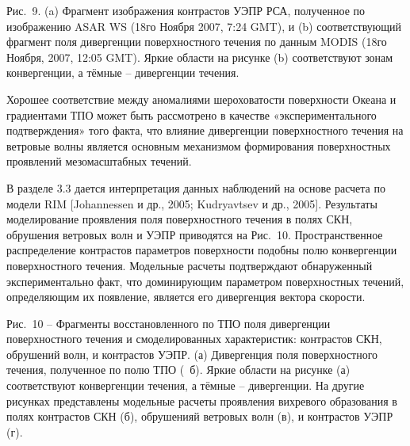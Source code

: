 Рис.~9. (a) Фрагмент изображения контрастов УЭПР РСА, полученное по изображению ASAR WS (18го Ноября 2007, 7:24 GMT), и (b) соответствующий фрагмент поля дивергенции поверхностного течения по данным MODIS (18го Ноября, 2007, 12:05 GMT). Яркие области на рисунке (b) соответствуют зонам конвергенции, а тёмные -- дивергенции течения.



Хорошее соответствие между аномалиями шероховатости поверхности Океана и градиентами ТПО может быть рассмотрено в качестве «экспериментального подтверждения» того факта, что влияние дивергенции поверхностного течения на ветровые волны является основным механизмом формирования поверхностных проявлений мезомасштабных течений. 



В разделе 3.3 дается интерпретация данных наблюдений на основе расчета по модели RIM [Johannessen и др., 2005; Kudryavtsev и др., 2005]. Результаты моделирование проявления поля поверхностного течения в полях СКН, обрушения ветровых волн и УЭПР приводятся на Рис.~10. Пространственное распределение контрастов параметров поверхности подобны полю конвергенции поверхностного течения. Модельные расчеты подтверждают обнаруженный экспериментально факт, что доминирующим параметром поверхностных течений, определяющим их появление, является его дивергенция вектора скорости. 



Рис.~10 -- Фрагменты восстановленного по ТПО поля дивергенции поверхностного течения и смоделированных характеристик: контрастов СКН, обрушений волн, и контрастов УЭПР. (а) Дивергенция поля поверхностного течения, полученное по полю ТПО (~б). Яркие области на рисунке (а) соответствуют конвергенции течения, а тёмные -- дивергенции. На другие рисунках представлены модельные расчеты проявления вихревого образования в полях контрастов СКН (б), обрушенияй ветровых волн (в), и контрастов УЭПР (г).


\clearpage
